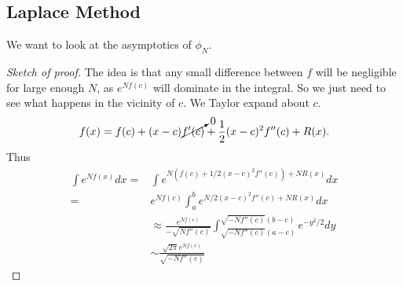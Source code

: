 \subsection*{Laplace Method}
We want to look at the asymptotics of $\phi_N$. 
\begin{proof}[Sketch of proof]
    The idea is that any small difference between $f$ will be negligible for large enough $N$, as $e^{Nf(c)}$ will dominate in the integral. So we just need to see what happens in the vicinity of $c$.
    We Taylor expand about $c$. \begin{align*}
        f(x) = f(c) +(x-c)\cancelto{0}{f'(c)} + \frac{1}{2}(x-c)^2f''(c) + R(x).
    \end{align*}
    Thus \begin{align*}
        \int e^{Nf(x)} dx =& \int e^{N(f(c)+1/2(x-c)^2f''(c))+NR(x)}dx \\
        =& e^{Nf(c)}\int_a^b e^{N/2 (x-c)^2 f''(c)+NR(x)}dx \\
        &\approx \frac{e^{Nf(c)}}{-\sqrt{Nf''(c)}} \int_{\sqrt{-Nf''(c)}(a-c)}^{\sqrt{-Nf''(c)}(b-c)}e^{-y^2/2}dy\\
        &\sim \frac{\sqrt{2\pi}e^{Nf(c)}}{\sqrt{-Nf''(c)}}
    \end{align*}
\end{proof}

